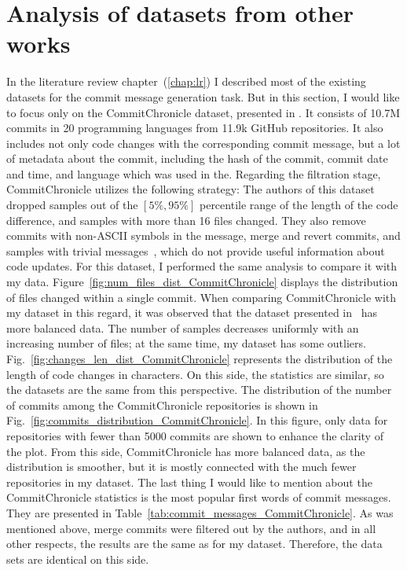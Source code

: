 \section{Analysis of datasets from other works}
In the literature review chapter~(\ref{chap:lr}) I described most of the existing datasets for the commit message generation task. But in this section, I would like to focus only on the CommitChronicle dataset, presented in {}\cite{eliseeva2023commit}. It consists of 10.7M commits in 20 programming languages from 11.9k GitHub repositories. It also includes not only code changes with the corresponding commit message, but a lot of metadata about the commit, including the hash of the commit, commit date and time, and language which was used in the.
Regarding the filtration stage, CommitChronicle utilizes the following strategy: The authors of this dataset dropped samples out of the $[5\%, 95\%]$ percentile range of the length of the code difference, and samples with more than 16 files changed. They also remove commits with non-ASCII symbols in the message, merge and revert commits, and samples with trivial messages~\cite{liu2018neural}, which do not provide useful information about code updates. 
For this dataset, I performed the same analysis to compare it with my data. Figure~{}\ref{fig:num_files_dist_CommitChronicle} displays the distribution of files changed within a single commit. When comparing CommitChronicle with my dataset in this regard, it was observed that the dataset presented in~\cite{eliseeva2023commit} has more balanced data. The number of samples decreases uniformly with an increasing number of files; at the same time, my dataset has some outliers. Fig.~{}\ref{fig:changes_len_dist_CommitChronicle} represents the distribution of the length of code changes in characters. On this side, the statistics are similar, so the datasets are the same from this perspective. The distribution of the number of commits among the CommitChronicle repositories is shown in Fig.~{}\ref{fig:commits_distribution_CommitChronicle}. In this figure, only data for repositories with fewer than 5000 commits are shown to enhance the clarity of the plot. From this side, CommitChronicle has more balanced data, as the distribution is smoother, but it is mostly connected with the much fewer repositories in my dataset. The last thing I would like to mention about the CommitChronicle statistics is the most popular first words of commit messages. They are presented in Table~{}\ref{tab:commit_messages_CommitChronicle}. As was mentioned above, merge commits were filtered out by the authors, and in all other respects, the results are the same as for my dataset. Therefore, the data sets are identical on this side.


